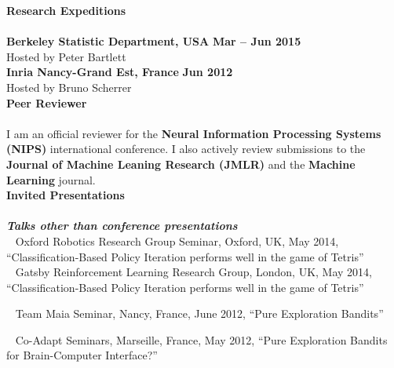 \noindent\textbf{Research Expeditions}\\[-.4cm]\noindent\makebox[\linewidth]{\rule{\columnwidth}{0.4pt}}\\[.1cm]
\noindent\textbf{Berkeley Statistic Department, USA} \hfill \textbf{Mar -- Jun 2015} \\
Hosted by Peter Bartlett\\
\noindent\textbf{Inria Nancy-Grand Est, France} \hfill \textbf{Jun 2012} \\
Hosted by Bruno Scherrer\\

\newpage
\noindent\textbf{Peer Reviewer}\\[-.4cm]\noindent\makebox[\linewidth]{\rule{\columnwidth}{0.4pt}}\\[.1cm]
I am an official reviewer for the \textbf{Neural Information Processing Systems (NIPS)} international conference. I also actively review submissions to the \textbf{Journal of Machine Leaning Research (JMLR)} and the \textbf{Machine Learning} journal.\\

\noindent 
\textbf{Invited Presentations}
\\[-.4cm]\noindent\makebox[\linewidth]{\rule{\columnwidth}{0.4pt}}\\[.1cm]
\textbf{\textit{Talks other than conference presentations}}\\
\textbullet~ Oxford Robotics Research Group Seminar, Oxford, UK, May 2014, 
 ``Classification-Based Policy Iteration performs well in the game of Tetris''\\
\noindent \textbullet~  Gatsby Reinforcement Learning Research Group, London, UK, May 2014, 
 ``Classification-Based Policy Iteration performs well in the game of Tetris''
  
\noindent \textbullet~ Team Maia Seminar, Nancy, France, June 2012, 
 ``Pure Exploration Bandits''
 
\noindent\textbullet~ Co-Adapt Seminars, Marseille, France,  May 2012, 
 ``Pure Exploration Bandits for Brain-Computer Interface?''\\

